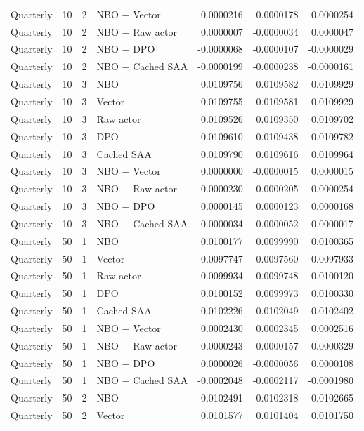 \begin{longtable}{llrlrrr}
Quarterly & 10 & 2 & NBO $-$ Vector & 0.0000216 & 0.0000178 & 0.0000254 \\
Quarterly & 10 & 2 & NBO $-$ Raw actor & 0.0000007 & -0.0000034 & 0.0000047 \\
Quarterly & 10 & 2 & NBO $-$ DPO & -0.0000068 & -0.0000107 & -0.0000029 \\
Quarterly & 10 & 2 & NBO $-$ Cached SAA & -0.0000199 & -0.0000238 & -0.0000161 \\
Quarterly & 10 & 3 & NBO & 0.0109756 & 0.0109582 & 0.0109929 \\
Quarterly & 10 & 3 & Vector & 0.0109755 & 0.0109581 & 0.0109929 \\
Quarterly & 10 & 3 & Raw actor & 0.0109526 & 0.0109350 & 0.0109702 \\
Quarterly & 10 & 3 & DPO & 0.0109610 & 0.0109438 & 0.0109782 \\
Quarterly & 10 & 3 & Cached SAA & 0.0109790 & 0.0109616 & 0.0109964 \\
Quarterly & 10 & 3 & NBO $-$ Vector & 0.0000000 & -0.0000015 & 0.0000015 \\
Quarterly & 10 & 3 & NBO $-$ Raw actor & 0.0000230 & 0.0000205 & 0.0000254 \\
Quarterly & 10 & 3 & NBO $-$ DPO & 0.0000145 & 0.0000123 & 0.0000168 \\
Quarterly & 10 & 3 & NBO $-$ Cached SAA & -0.0000034 & -0.0000052 & -0.0000017 \\
Quarterly & 50 & 1 & NBO & 0.0100177 & 0.0099990 & 0.0100365 \\
Quarterly & 50 & 1 & Vector & 0.0097747 & 0.0097560 & 0.0097933 \\
Quarterly & 50 & 1 & Raw actor & 0.0099934 & 0.0099748 & 0.0100120 \\
Quarterly & 50 & 1 & DPO & 0.0100152 & 0.0099973 & 0.0100330 \\
Quarterly & 50 & 1 & Cached SAA & 0.0102226 & 0.0102049 & 0.0102402 \\
Quarterly & 50 & 1 & NBO $-$ Vector & 0.0002430 & 0.0002345 & 0.0002516 \\
Quarterly & 50 & 1 & NBO $-$ Raw actor & 0.0000243 & 0.0000157 & 0.0000329 \\
Quarterly & 50 & 1 & NBO $-$ DPO & 0.0000026 & -0.0000056 & 0.0000108 \\
Quarterly & 50 & 1 & NBO $-$ Cached SAA & -0.0002048 & -0.0002117 & -0.0001980 \\
Quarterly & 50 & 2 & NBO & 0.0102491 & 0.0102318 & 0.0102665 \\
Quarterly & 50 & 2 & Vector & 0.0101577 & 0.0101404 & 0.0101750 \\

\end{longtable}
